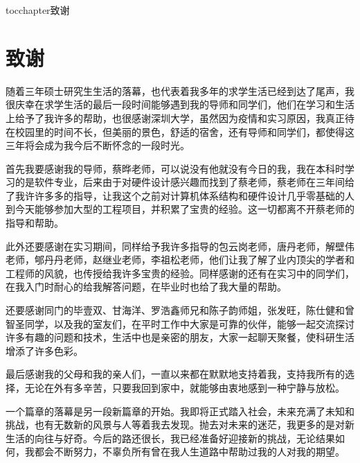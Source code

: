 
\newenvironment{theacknowledgements}{\wuhao\song}

\addcontentsline{toc}{chapter}{致谢}%
\chapter*{\centering\xiaosan\hei\bfseries 致\quad 谢}

\begin{theacknowledgements}
	
随着三年硕士研究生生活的落幕，也代表着我多年的求学生活已经到达了尾声，我很庆幸在求学生活的最后一段时间能够遇到我的导师和同学们，他们在学习和生活上给予了我许多的帮助，也很感谢深圳大学，虽然因为疫情和实习原因，我真正待在校园里的时间不长，但美丽的景色，舒适的宿舍，还有导师和同学们，都使得这三年将会成为我今后不断怀念的一段时光。

首先我要感谢我的导师，蔡晔老师，可以说没有他就没有今日的我，我在本科时学习的是软件专业，后来由于对硬件设计感兴趣而找到了蔡老师，蔡老师在三年间给了我许许多多的指导，让我这个之前对计算机体系结构和硬件设计几乎零基础的人到今天能够参加大型的工程项目，并积累了宝贵的经验。这一切都离不开蔡老师的指导和帮助。

此外还要感谢在实习期间，同样给予我许多指导的包云岗老师，唐丹老师，解壁伟老师，郇丹丹老师，赵继业老师，李祖松老师，他们让我了解了业内顶尖的学者和工程师的风貌，也传授给我许多宝贵的经验。同样感谢的还有在实习中的同学们，在我入门时耐心的给我解答问题，在毕业时也给了我大量的帮助。

还要感谢同门的毕壹双、甘海洋、罗浩鑫师兄和陈子韵师姐，张发旺，陈仕健和曾智圣同学，以及我的室友们，在平时工作中大家是可靠的伙伴，能够一起交流探讨许多有趣的问题和技术，生活中也是亲密的朋友，大家一起聊天聚餐，使科研生活增添了许多色彩。

最后感谢我的父母和我的亲人们，一直以来都在默默地支持着我，支持我所有的选择，无论在外有多辛苦，只要我回到家中，就能够由衷地感到一种宁静与放松。

一个篇章的落幕是另一段新篇章的开始。我即将正式踏入社会，未来充满了未知和挑战，也有无数新的风景与人等着我去发现。抛去对未来的迷茫，我更多的是对新生活的向往与好奇。今后的路还很长，我已经准备好迎接新的挑战，无论结果如何，我都会不断努力，不辜负所有曾在我人生道路中帮助过我的人对我的期望。

\end{theacknowledgements}





